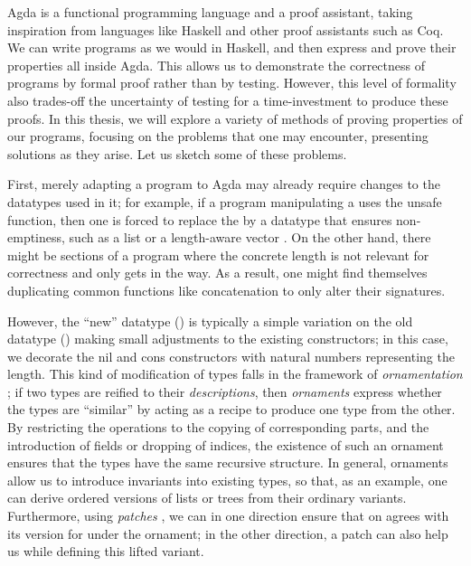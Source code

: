 Agda \cite{agda} is a functional programming language and a proof assistant, taking inspiration from languages like Haskell and other proof assistants such as Coq. We can write programs as we would in Haskell, and then express and prove their properties all inside Agda. This allows us to demonstrate the correctness of programs by formal proof rather than by testing. However, this level of formality also trades-off the uncertainty of testing for a time-investment to produce these proofs. In this thesis, we will explore a variety of methods of proving properties of our programs, focusing on the problems that one may encounter, presenting solutions as they arise. Let us sketch some of these problems.

First, merely adapting a program to Agda may already require changes to the datatypes used in it; for example, if a program manipulating a  uses the unsafe  function, then one is forced to replace the  by a datatype that ensures non-emptiness, such as a  list or a length-aware vector . On the other hand, there might be sections of a program where the concrete length is not relevant for correctness and only gets in the way. As a result, one might find themselves duplicating common functions like concatenation \AgdaFunction{\_++\_} to only alter their signatures.

However, the ``new'' datatype () is typically a simple variation on the old datatype () making small adjustments to the existing constructors; in this case, we decorate the nil and cons constructors with natural numbers representing the length. This kind of modification of types falls in the framework of \textit{ornamentation} \cite{progorn}; if two types are reified to their \textit{descriptions}, then \textit{ornaments} express whether the types are ``similar'' by acting as a recipe to produce one type from the other. By restricting the operations to the copying of corresponding parts, and the introduction of fields or dropping of indices, the existence of such an ornament ensures that the types have the same recursive structure. In general, ornaments allow us to introduce invariants into existing types, so that, as an example, one can derive ordered versions of lists or trees from their ordinary variants. Furthermore, using \textit{patches} \cite{orntrans}, we can in one direction ensure that \AgdaFunction{\_++\_} on  agrees with its version for  under the ornament; in the other direction, a patch can also help us while defining this lifted variant.

